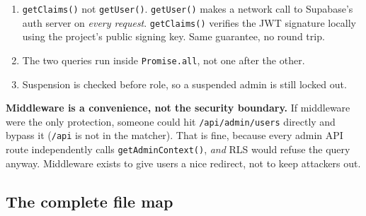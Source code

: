 \documentclass[11pt,a4paper]{article}
\begin{document}
\begin{enumerate}[leftmargin=*,noitemsep]
  \item \texttt{getClaims()} not \texttt{getUser()}. \texttt{getUser()} makes a
        network call to Supabase's auth server on \emph{every request}.
        \texttt{getClaims()} verifies the JWT signature locally using the
        project's public signing key. Same guarantee, no round trip.
  \item The two queries run inside \texttt{Promise.all}, not one after the other.
  \item Suspension is checked before role, so a suspended admin is still locked out.
\end{enumerate}

\begin{warnbox}
\textbf{Middleware is a convenience, not the security boundary.} If middleware
were the only protection, someone could hit \texttt{/api/admin/users} directly
and bypass it (\texttt{/api} is not in the matcher). That is fine, because every
admin API route independently calls \texttt{getAdminContext()}, \emph{and} RLS
would refuse the query anyway. Middleware exists to give users a nice redirect,
not to keep attackers out.
\end{warnbox}

\subsection{The complete file map}
\end{document}
